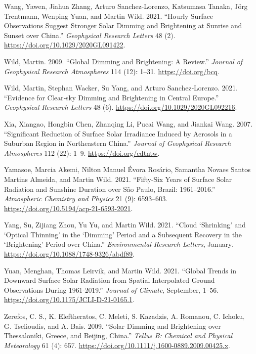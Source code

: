 \documentclass[
  preprint, 3p, authoryear]{article}
\newlength{\cslhangindent}
\newlength{\cslentryspacingunit} %
\newenvironment{CSLReferences}[2] %
 {%
  \setlength{\parindent}{0pt}
  \ifodd #1
  \let\oldpar\par
  \def\par{\hangindent=\cslhangindent\oldpar}
  \fi
  \setlength{\parskip}{#2\cslentryspacingunit}
 }%
 {}
\begin{document}
\begin{CSLReferences}{1}{0}
\leavevmode{}%
Wang, Yawen, Jiahua Zhang, Arturo Sanchez‐Lorenzo, Katsumasa Tanaka, Jörg Trentmann, Wenping Yuan, and Martin Wild. 2021. {``Hourly Surface Observations Suggest Stronger Solar Dimming and Brightening at Sunrise and Sunset over China.''} \emph{Geophysical Research Letters} 48 (2). \url{https://doi.org/10.1029/2020GL091422}.

\leavevmode{}%
Wild, Martin. 2009. {``Global Dimming and Brightening: A Review.''} \emph{Journal of Geophysical Research Atmospheres} 114 (12): 1--31. \url{https://doi.org/bcq}.

\leavevmode{}%
Wild, Martin, Stephan Wacker, Su Yang, and Arturo Sanchez‐Lorenzo. 2021. {``Evidence for Clear‐sky Dimming and Brightening in Central Europe.''} \emph{Geophysical Research Letters} 48 (6). \url{https://doi.org/10.1029/2020GL092216}.

\leavevmode{}%
Xia, Xiangao, Hongbin Chen, Zhanqing Li, Pucai Wang, and Jiankai Wang. 2007. {``Significant Reduction of Surface Solar Irradiance Induced by Aerosols in a Suburban Region in Northeastern China.''} \emph{Journal of Geophysical Research Atmospheres} 112 (22): 1--9. \url{https://doi.org/cdtntw}.

\leavevmode{}%
Yamasoe, Marcia Akemi, Nilton Manuel Évora Rosário, Samantha Novaes Santos Martins Almeida, and Martin Wild. 2021. {``Fifty-Six Years of Surface Solar Radiation and Sunshine Duration over São Paulo, Brazil: 1961--2016.''} \emph{Atmospheric Chemistry and Physics} 21 (9): 6593--603. \url{https://doi.org/10.5194/acp-21-6593-2021}.

\leavevmode{}%
Yang, Su, Zijiang Zhou, Yu Yu, and Martin Wild. 2021. {``Cloud {`Shrinking'} and {`Optical Thinning'} in the {`Dimming'} Period and a Subsequent Recovery in the {`Brightening'} Period over China.''} \emph{Environmental Research Letters}, January. \url{https://doi.org/10.1088/1748-9326/abdf89}.

\leavevmode{}%
Yuan, Menghan, Thomas Leirvik, and Martin Wild. 2021. {``Global Trends in Downward Surface Solar Radiation from Spatial Interpolated Ground Observations During 1961-2019.''} \emph{Journal of Climate}, September, 1--56. \url{https://doi.org/10.1175/JCLI-D-21-0165.1}.

\leavevmode{}%
Zerefos, C. S., K. Eleftheratos, C. Meleti, S. Kazadzis, A. Romanou, C. Ichoku, G. Tselioudis, and A. Bais. 2009. {``Solar Dimming and Brightening over Thessaloniki, Greece, and Beijing, China.''} \emph{Tellus B: Chemical and Physical Meteorology} 61 (4): 657. \url{https://doi.org/10.1111/j.1600-0889.2009.00425.x}.

\end{CSLReferences}
\end{document}
